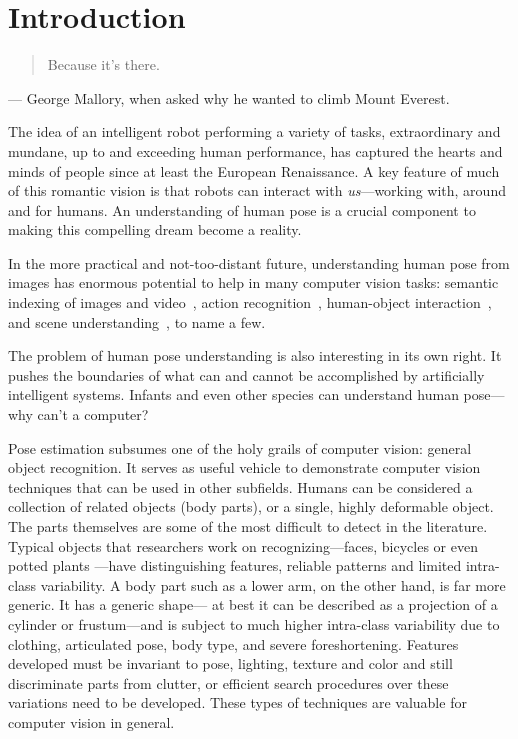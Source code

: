 \chapter{Introduction}
\begin{quote}
Because it's there.
\end{quote}
\hfill --- George Mallory, when asked why he wanted to climb Mount Everest.\\
\vspace{0.5in}

The idea of an intelligent robot performing a variety of tasks, extraordinary 
and mundane, up to and exceeding human performance, has captured the hearts and 
minds of people since at least the European Renaissance.  A key feature of much 
of this romantic vision is that robots can interact with {\em us}---working 
with, around and for humans.  An understanding of human pose is a crucial 
component to making this compelling dream become a reality.  

In the more practical and not-too-distant future, understanding human pose from 
images has enormous potential to help in many computer vision tasks: semantic 
indexing of images and video~\citep{posesearch}, action 
recognition~\citep{pose-action11}, human-object interaction~\citep{bangpeng12}, 
and scene understanding~\citep{gupta11}, to name a few.   

The problem of human pose understanding is also interesting in its own right.  
It pushes the boundaries of what can and cannot be accomplished by artificially 
intelligent systems.  Infants and even other species can understand human 
pose---why can't a computer?  

Pose estimation subsumes one of the holy grails of computer vision: general 
object recognition.  It serves as useful vehicle to demonstrate computer vision 
techniques that can be used in other subfields.  Humans can be considered a 
collection of related objects (body parts), or a single, highly deformable 
object.  The parts themselves are some of the most difficult to detect in the 
literature.  Typical objects that researchers work on recognizing---faces, 
bicycles or even potted plants \citep{voc09}---have distinguishing features, 
reliable patterns and limited intra-class variability.  A body part such as a 
lower arm, on the other hand, is far more generic.  It has a generic shape---
at best it can be described as a projection of a cylinder or frustum---and is 
subject to much higher intra-class variability due to clothing, articulated 
pose, body type, and severe foreshortening.  Features developed must be 
invariant to pose, lighting, texture and color and still discriminate parts 
from clutter, or efficient search procedures over these variations need to be 
developed. These types of techniques are valuable for computer vision in 
general.


